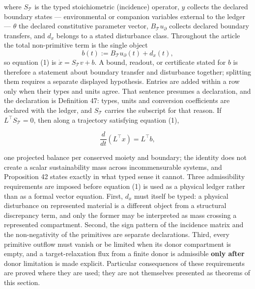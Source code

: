 \documentclass[11pt]{article}
\begin{document}
 where \(S_{\mathcal{T}}\) is the typed stoichiometric (incidence) operator, \(y\) collects the declared boundary states --- environmental or companion variables external to the ledger --- \(\theta\) the declared constitutive parameter vector, \(B_{\mathcal{T}} u_{\partial}\) collects declared boundary transfers, and \(d_x\) belongs to a stated disturbance class. Throughout the article the total non-primitive term is the single object
$$b(t):=B_{\mathcal{T}}u_{\partial}(t)+d_x(t),$$
so equation (1) is \(\dot x=S_{\mathcal{T}}v+b\). A bound, readout, or certificate stated for \(b\) is therefore a statement about boundary transfer and disturbance together; splitting them requires a separate displayed hypothesis. Entries are added within a row only when their types and units agree. That sentence presumes a declaration, and the declaration is Definition 47: types, units and conversion coefficients are declared with the ledger, and \(S_{\mathcal{T}}\) carries the subscript for that reason. If \(L^\top S_{\mathcal{T}} = 0\), then along a trajectory satisfying equation (1),

$$\frac{d}{dt}(L^\top x) = L^\top b,$$

 one projected balance per conserved moiety and boundary; the identity does not create a scalar sustainability mass across incommensurable systems, and Proposition 42 states exactly in what typed sense it cannot. Three admissibility requirements are imposed before equation (1) is used as a physical ledger rather than as a formal vector equation. First, \(d_x\) must itself be typed: a physical disturbance on represented material is a different object from a structural discrepancy term, and only the former may be interpreted as mass crossing a represented compartment. Second, the sign pattern of the incidence matrix and the non-negativity of the primitives are separate declarations. Third, every primitive outflow must vanish or be limited when its donor compartment is empty, and a target-relaxation flux from a finite donor is admissible \textbf{only after} donor limitation is made explicit. Particular consequences of these requirements are proved where they are used; they are not themselves presented as theorems of this section.
\end{document}
